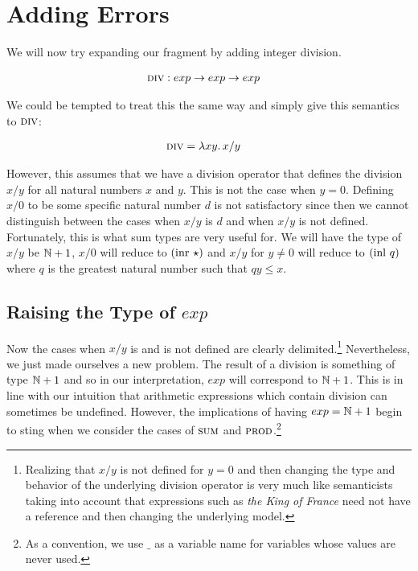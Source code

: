 \section{Adding Errors}

We will now try expanding our fragment by adding integer division.

\begin{align*}
  \textsc{div} &: exp \to exp \to exp
\end{align*}

We could be tempted to treat this the same way and simply give this
semantics to $\textsc{div}$:

\begin{align*}
  \textsc{div} &= \lambda x y.\, x / y
\end{align*}

However, this assumes that we have a division operator that defines the
division $x/y$ for all natural numbers $x$ and $y$. This is not the case
when $y = 0$. Defining $x/0$ to be some specific natural number $d$ is not
satisfactory since then we cannot distinguish between the cases when $x/y$
is $d$ and when $x/y$ is not defined. Fortunately, this is what sum types
are very useful for. We will have the type of $x/y$ be $\mathbb{N} + 1$, $x/0$
will reduce to $(\operatorname{inr}\,\star)$ and $x/y$ for $y \neq 0$ will reduce to
$(\operatorname{inl}\,q)$ where $q$ is the greatest natural number such that
$q y \le x$.


\subsection{Raising the Type of $exp$}
\label{ssec:raising-the-type-of-exp}

Now the cases when $x/y$ is and is not defined are clearly
delimited.\footnote{Realizing that $x/y$ is not defined for $y = 0$ and
  then changing the type and behavior of the underlying division operator
  is very much like semanticists taking into account that expressions such
  as \emph{the King of France} need not have a reference and then changing
  the underlying model.} Nevertheless, we just made ourselves a new
problem. The result of a division is something of type $\mathbb{N} + 1$ and so in
our interpretation, $exp$ will correspond to $\mathbb{N} + 1$. This is in line
with our intuition that arithmetic expressions which contain division can
sometimes be undefined. However, the implications of having $exp = \mathbb{N} + 1$
begin to sting when we consider the cases of $\textsc{sum}$ and
$\textsc{prod}$.\footnote{As a convention, we use $\_$ as a variable name for
  variables whose values are never used.}

